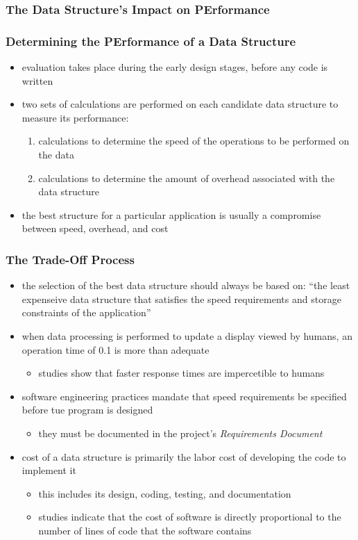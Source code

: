 \documentclass[11pt]{article}
\begin{document}
\subsubsection{The Data Structure's Impact on PErformance}
\label{sec:org5142eff}


\subsubsection{Determining the PErformance of a Data Structure}
\label{sec:orgec39950}
\begin{itemize}
\item evaluation takes place during the early design stages, before any code is written
\item two sets of calculations are performed on each candidate data structure to measure its performance:
\begin{enumerate}
\item calculations to determine the speed of the operations to be performed on the data
\item calculations to determine the amount of overhead associated with the data structure
\end{enumerate}
\item the best structure for a particular application is usually a compromise between speed, overhead, and cost
\end{itemize}
\subsubsection{The Trade-Off Process}
\label{sec:org6337a27}
\begin{itemize}
\item the selection of the best data structure should always be based on:
``the least expenseive data structure that satisfies the speed requirements and storage constraints of the application''
\item when data processing is performed to update a display viewed by humans, an operation time of 0.1 is more than adequate
\begin{itemize}
\item studies show that faster response times are impercetible to humans
\end{itemize}
\item software engineering practices mandate that speed requirements be specified before tue program is designed
\begin{itemize}
\item they must be documented in the project's \emph{Requirements Document}
\end{itemize}
\item cost of a data structure is primarily the labor cost of developing the code to implement it
\begin{itemize}
\item this includes its design, coding, testing, and documentation
\item studies indicate that the cost of software is directly proportional to the number of lines of code that the software contains
\end{itemize}
\end{itemize}
\end{document}
